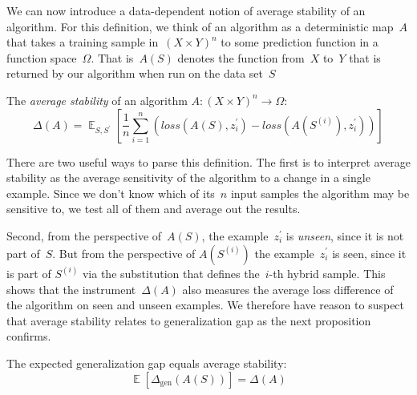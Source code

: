 \documentclass{tufte-book}
\begin{document}
We can now introduce a data-dependent notion of average stability of an
algorithm. For this definition, we think of an algorithm as a
deterministic map~\(A\) that takes a training sample
in~\((X\times Y)^n\) to some prediction function in a function
space~\(\Omega\). That is~\(A(S)\) denotes the function from~\(X\)
to~\(Y\) that is returned by our algorithm when run on the data
set~\(S\)


\begin{Definition}

The \emph{average stability} of an algorithm
\(A\colon (X \times Y)^{n} \rightarrow \Omega\): \[
\Delta(A) = \mathop\mathbb{E}_{S,S^{\prime}}
\left[
\frac{1}{n}\sum_{i=1}^{n}
\left(\mathit{loss}(A(S),z_i^{\prime}) -\mathit{loss}(A(S^{(i)}),z_{i}^{\prime})\right)
\right]
\]

\end{Definition}

There are two useful ways to parse this definition. The first is to
interpret average stability as the average sensitivity of the algorithm
to a change in a single example. Since we don't know which of its~\(n\)
input samples the algorithm may be sensitive to, we test all of them and
average out the results.

Second, from the perspective of~\(A(S)\), the example~\(z_i^\prime\) is
\emph{unseen}, since it is not part of~\(S.\) But from the perspective
of \(A(S^{(i)})\) the example~\(z_i^\prime\) is seen, since it is part
of \(S^{(i)}\) via the substitution that defines the~\(i\)-th hybrid
sample. This shows that the instrument~\(\Delta(A)\) also measures the
average loss difference of the algorithm on seen and unseen examples. We
therefore have reason to suspect that average stability relates to
generalization gap as the next proposition confirms.

\begin{Proposition}

The expected generalization gap equals average stability: \[
\mathop\mathbb{E}[\Delta_{\mathrm{gen}}(A(S))] = \Delta(A)
\]

\end{Proposition}
\end{document}
